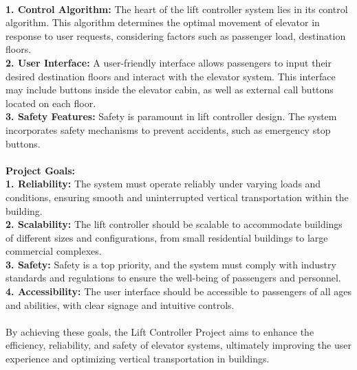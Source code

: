 \documentclass{article}
\begin{document}
\\
\textbf{1.	Control Algorithm:} The heart of the lift controller system lies in its control algorithm. This algorithm determines the optimal movement of elevator in response to user requests, considering factors such as passenger load, destination floors.\\
\textbf{2.	User Interface: }A user-friendly interface allows passengers to input their desired destination floors and interact with the elevator system. This interface may include buttons inside the elevator cabin, as well as external call buttons located on each floor.\\
\textbf{3.	Safety Features:} Safety is paramount in lift controller design. The system incorporates safety mechanisms to prevent accidents, such as emergency stop buttons.\\
\\
{\large \textbf{Project Goals:}}\\
\textbf{1.	Reliability:} The system must operate reliably under varying loads and conditions, ensuring smooth and uninterrupted vertical transportation within the building.\\
\textbf{2.	Scalability:} The lift controller should be scalable to accommodate buildings of different sizes and configurations, from small residential buildings to large commercial complexes.\\
\textbf{3.	Safety:} Safety is a top priority, and the system must comply with industry standards and regulations to ensure the well-being of passengers and personnel.\\
\textbf{4.	Accessibility:} The user interface should be accessible to passengers of all ages and abilities, with clear signage and intuitive controls.\\
\\
By achieving these goals, the Lift Controller Project aims to enhance the efficiency, reliability, and safety of elevator systems, ultimately improving the user experience and optimizing vertical transportation in buildings.\\



    
\end{document}
